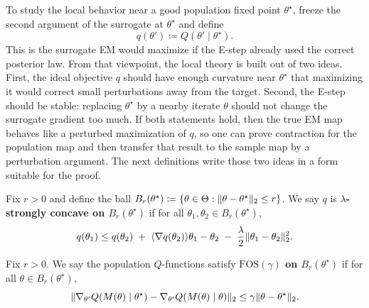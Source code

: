 \documentclass[11pt]{article}
\begin{document}
To study the local behavior near a good population fixed point $\theta^\star$, freeze the second argument of the surrogate at $\theta^\star$ and define
\[
q(\theta') \coloneqq Q(\theta' \mid \theta^\star).
\]
This is the surrogate EM would maximize if the E-step already used the correct posterior law.
From that viewpoint, the local theory is built out of two ideas.
First, the ideal objective $q$ should have enough curvature near $\theta^\star$ that maximizing it would correct small perturbations away from the target.
Second, the E-step should be stable: replacing $\theta^\star$ by a nearby iterate $\theta$ should not change the surrogate gradient too much.
If both statements hold, then the true EM map behaves like a perturbed maximization of $q$, so one can prove contraction for the population map and then transfer that result to the sample map by a perturbation argument.
The next definitions write those two ideas in a form suitable for the proof.

\begin{definition}
\label{def:em-local-strong-concavity}
Fix $r>0$ and define the ball $B_r(\theta^\star)\coloneqq\{\theta\in\Theta:\lVert\theta-\theta^\star\rVert_2\le r\}$.
We say $q$ is \textbf{$\lambda$-strongly concave on $B_r(\theta^\star)$} if for all $\theta_1,\theta_2\in B_r(\theta^\star)$,
\[
q(\theta_1)
\le
q(\theta_2)
\;+\;
\langle\nabla q(\theta_2)\rangle{\theta_1-\theta_2}
\;-\;
\frac{\lambda}{2}\lVert\theta_1-\theta_2\rVert_2^2.
\]
\end{definition}

\begin{definition}
\label{def:em-fos}
Fix $r>0$.
We say the population $Q$-functions satisfy \textbf{$\mathrm{FOS}(\gamma)$ on $B_r(\theta^\star)$} if for all $\theta\in B_r(\theta^\star)$,
\[
\lVert\nabla_{\theta'} Q(M(\theta)\mid \theta^\star)-\nabla_{\theta'} Q(M(\theta)\mid \theta)\rVert_2
\le
\gamma \lVert\theta-\theta^\star\rVert_2.
\]
\end{definition}
\end{document}
